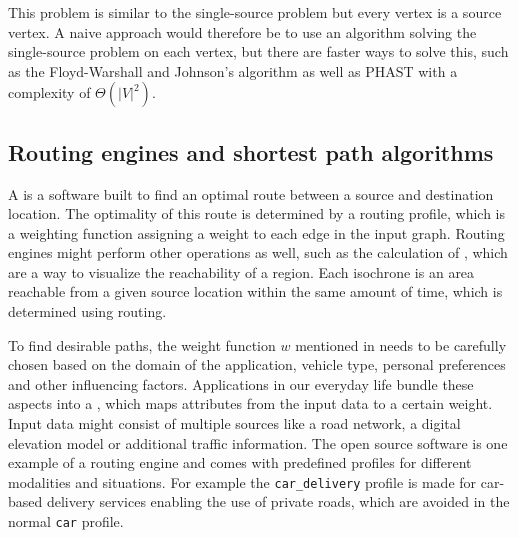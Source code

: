 		\subsubsection{}
		\label{subsubsec:all-pair-shortest-path}
		
			This problem is similar to the single-source problem but every vertex is a source vertex.
			A naive approach would therefore be to use an algorithm solving the single-source problem on each vertex, but there are faster ways to solve this, such as the Floyd-Warshall and Johnson's algorithm\cite[693,700]{cormen-introduction-to-alg} as well as PHAST\cite{bast-transportation-networks} with a complexity of $\Theta(|V|^2)$.
		
	\subsection{Routing engines and shortest path algorithms}
	\label{subsec:routing-engines}
		
		A  is a software built to find an optimal route between a source and destination location.
		The optimality of this route is determined by a routing profile, which is a weighting function assigning a weight to each edge in the input graph.
		Routing engines might perform other operations as well, such as the calculation of , which are a way to visualize the reachability of a region\cite{allen-isochrones}.
		Each isochrone is an area reachable from a given source location within the same amount of time, which is determined using routing.
		
		To find desirable paths, the weight function $w$ mentioned in  needs to be carefully chosen based on the domain of the application, vehicle type, personal preferences and other influencing factors.
		Applications in our everyday life bundle these aspects into a , which maps attributes from the input data to a certain weight.
		Input data might consist of multiple sources like a road network, a digital elevation model or additional traffic information.
		The open source software  is one example of a routing engine and comes with predefined profiles for different modalities and situations.
		For example the \texttt{car\_delivery} profile is made for car-based delivery services enabling the use of private roads\cite{graphhopper-routing-profiles}, which are avoided in the normal \texttt{car} profile.
		
